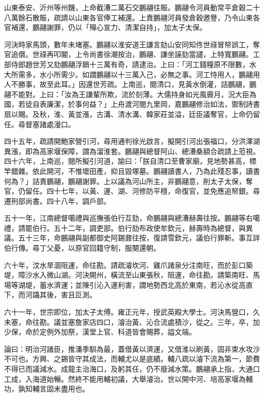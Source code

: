 \begin{pinyinscope}
山東泰安、沂州等州饑，上命截漕二萬石交鵬翮往賑。鵬翮令河員動常平倉穀二十八萬餘石散賑，疏請以山東各官俸工補還。上責鵬翮河員發倉穀邀譽，乃令山東各官補還，鵬翮謝罪，仍以「殫心宣力、清潔自持」，加太子太保。

河決時家馬頭，數年未堵塞。鵬翮以淮安道王謙言劾山安同知佟世祿冒帑誤工，奪官追償。世祿再叩閽，上令尚書徐潮按治，鵬翮、謙坐誣劾當譴，上特寬鵬翮。工部侍郎趙世芳又劾鵬翮浮銷十三萬有奇，請逮治。上曰：「河工錢糧原不限數，水大所需多，水小所需少。如謂鵬翮以十三萬入己，必無之事。河工恃用人，鵬翮用人不勝事，故至此耳。」因還世芳疏。上南巡，閱清口，見黃水倒灌，詰鵬翮，鵬翮不能對。上曰：「汝為王謙輩所欺，流於刻薄。大儒持身如光風霽月，況大臣為國，若徒自表廉潔，於事何益？」上舟渡河閱九里岡，嘉鵬翮修治如法，禦制詩書扇以賜。及秋，淮、黃並漲，古溝、清水溝、韓家莊並溢，廷臣議奪官，上命仍留任。尋督塞諸處漫口。

四十五年，疏請開鮑家營引河，尋用通判徐光啟言，擬開引河出張福口，分洪澤湖異漲，即為高家堰保障，謂為溜淮套。鵬翮與總督阿山、總漕桑額合疏請上蒞視。四十六年，上南巡，閱所擬引河道，諭曰：「朕自清口至曹家廟，見地勢甚高，標竿錯雜。依此開河，不惟壞田產，抑且毀塚墓。鵬翮讀書人，乃為此殘忍事，讀書何為？」詰責鵬翮，鵬翮謝罪。上以議為河山所主，非鵬翮意，削太子太保，奪官，仍留任。四十七年，以黃、運、湖、河修防平穩，命復官，並免應追帑銀。尋遷刑部尚書。四十八年，調戶部。

五十一年，江南總督噶禮與巡撫張伯行互劾，命鵬翮與總漕赫壽往按。鵬翮等右噶禮，請罷伯行。五十二年，調吏部。伯行劾布政使牟欽元，赫壽時為總督，與異議。五十三年，命鵬翮與副都御史阿錫鼐往按，復請雪欽元，議伯行罪斬。事互詳伯行傳。尋丁父憂，以原官回籍守制，服闋還朝。

六十年，汶水旱涸阻運，命往勘。請疏濬坎河、雞爪諸泉分注南旺，而於彭口築堤，障沙水入微山湖。河決開州，橫流至山東張秋，阻運，命往勘。請築南旺、馬場等湖堤，蓄水濟運；並陳引沁入運利害，謂地勢西北高於東南，若沁水從高直下，而河躡其後，害且叵測。

六十一年，世宗即位，加太子太傅。雍正元年，授武英殿大學士。河決馬營口，久未塞，命往勘。議並塞詹家店四口，濬治黃、沁合流處積沙，從之。三年，卒，加少保，命於定例外加祭，漢堂上官、科道皆會賜葬，謚文端。

論曰：明治河諸臣，推潘季馴為最，蓋借黃以濟運，又借淮以刷黃，固非束水攻沙不可也。方興、之錫皆守其成法，而輔尤以是底績。輔八疏以濬下流為第一，節費不得已而議減水。成龍主治海口，及躬其任，仍不廢減水策。鵬翮承上指，大通口工成，入海道始暢。然終不能用輔初議，大舉濬治。世以開中河、培高家堰為輔功，孰知輔言固未盡用也。


\end{pinyinscope}
